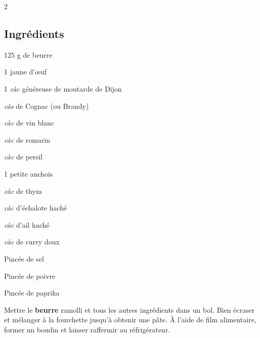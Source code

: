 \newpage
{}

\begin{multicols}{2}
	\subsection*{Ingrédients}
	\begin{ingredients}
		\item 125 g de beurre
		\item 1 jaune d'\oe{}uf
		\item 1 \textit{càc} généreuse de moutarde de Dijon
		\item {} \textit{càs} de Cognac (ou Brandy)
		\item {} \textit{càc} de vin blanc
		\item {} \textit{càc} de romarin
		\item {} \textit{càc} de persil
		\item 1 petite anchois
		\item {} \textit{càc} de thym
		\item {} \textit{càc} d'échalote haché
		\item {} \textit{càc} d'ail haché
		\item {} \textit{càc} de curry doux
		\item Pincée de sel
		\item Pincée de poivre
		\item Pincée de paprika
		
	\end{ingredients}
\end{multicols}

\medskip

Mettre le \textbf{beurre} ramolli et tous les autres ingrédients dans un bol.
Bien écraser et mélanger à la fourchette jusqu’à obtenir une pâte.
À l’aide de film alimentaire, former un boudin et laisser raffermir au réfrigérateur. 

\vspace*{0.75 cm}

\begin{recipeblock}
	
\end{recipeblock}